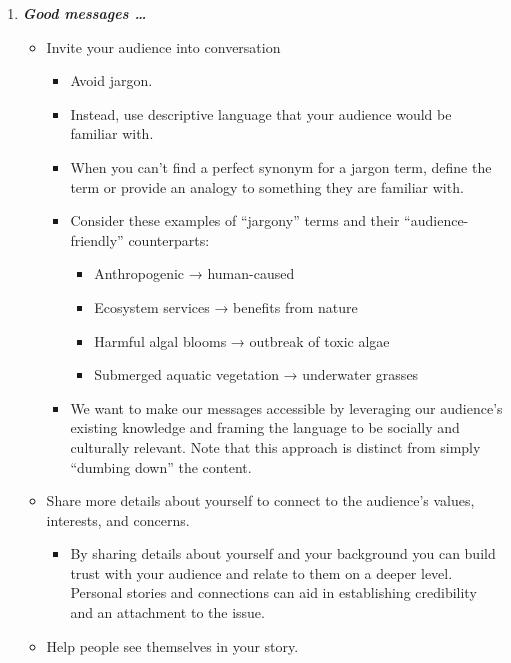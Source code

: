 \documentclass[
]{book}
\providecommand{\tightlist}{%
  \setlength{\itemsep}{0pt}\setlength{\parskip}{0pt}}
\begin{document}
\begin{enumerate}
\def\labelenumi{\arabic{enumi}.}
\setcounter{enumi}{1}
\item
  \textbf{\emph{Good messages \ldots{}}}

  \begin{itemize}
  \item
    Invite your audience into conversation

    \begin{itemize}
    \tightlist
    \item
      Avoid jargon.
    \item
      Instead, use descriptive language that your audience would be familiar with.
    \item
      When you can't find a perfect synonym for a jargon term, define the term or provide an analogy to something they are familiar with.
    \item
      Consider these examples of ``jargony'' terms and their ``audience-friendly'' counterparts:

      \begin{itemize}
      \tightlist
      \item
        Anthropogenic → human-caused
      \item
        Ecosystem services → benefits from nature
      \item
        Harmful algal blooms → outbreak of toxic algae
      \item
        Submerged aquatic vegetation → underwater grasses
      \end{itemize}
    \item
      We want to make our messages accessible by leveraging our audience's existing knowledge and framing the language to be socially and culturally relevant. Note that this approach is distinct from simply ``dumbing down'' the content.
    \end{itemize}
  \item
    Share more details about yourself to connect to the audience's values, interests, and concerns.

    \begin{itemize}
    \tightlist
    \item
      By sharing details about yourself and your background you can build trust with your audience and relate to them on a deeper level. Personal stories and connections can aid in establishing credibility and an attachment to the issue.
    \end{itemize}
  \item
    Help people see themselves in your story.


\end{itemize}
\end{enumerate}
\end{document}
